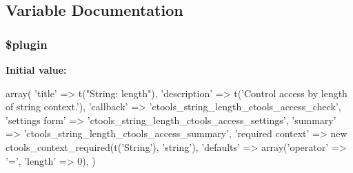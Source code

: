 \subsection{Variable Documentation}
\hypertarget{string__length_8inc_ada8a7130088351710bb02ed622d6bf65}{
\subsubsection[{\$plugin}]{\setlength{\rightskip}{0pt plus 5cm}\$plugin}}
\label{string__length_8inc_ada8a7130088351710bb02ed622d6bf65}
{\bfseries Initial value:}
\begin{DoxyCode}
 array(
  'title' => t("String: length"),
  'description' => t('Control access by length of string context.'),
  'callback' => 'ctools_string_length_ctools_access_check',
  'settings form' => 'ctools_string_length_ctools_access_settings',
  'summary' => 'ctools_string_length_ctools_access_summary',
  'required context' => new ctools_context_required(t('String'), 'string'),
  'defaults' => array('operator' => '=', 'length' => 0),
)
\end{DoxyCode}

